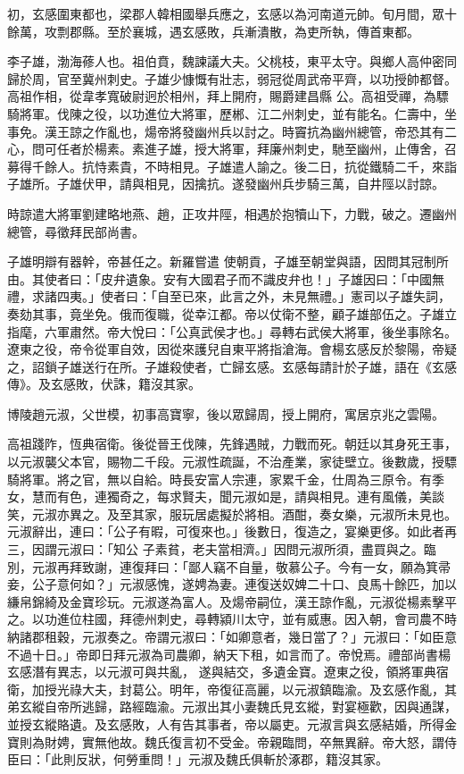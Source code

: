 \begin{pinyinscope}
 初，玄感圍東都也，梁郡人韓相國舉兵應之，玄感以為河南道元帥。旬月間，眾十餘萬，攻剽郡縣。至於襄城，遇玄感敗，兵漸潰散，為吏所執，傳首東都。



 李子雄，渤海蓚人也。祖伯賁，魏諫議大夫。父桃枝，東平太守。與鄉人高仲密同歸於周，官至冀州刺史。子雄少慷慨有壯志，弱冠從周武帝平齊，以功授帥都督。高祖作相，從韋孝寬破尉迥於相州，拜上開府，賜爵建昌縣
 公。高祖受禪，為驃騎將軍。伐陳之役，以功進位大將軍，歷郴、江二州刺史，並有能名。仁壽中，坐事免。漢王諒之作亂也，煬帝將發幽州兵以討之。時竇抗為幽州總管，帝恐其有二心，問可任者於楊素。素進子雄，授大將軍，拜廉州刺史，馳至幽州，止傳舍，召募得千餘人。抗恃素貴，不時相見。子雄遣人諭之。後二日，抗從鐵騎二千，來詣子雄所。子雄伏甲，請與相見，因擒抗。遂發幽州兵步騎三萬，自井陘以討諒。



 時諒遣大將軍劉建略地燕、趙，正攻井陘，相遇於抱犢山下，力戰，破之。遷幽州總管，尋徵拜民部尚書。



 子雄明辯有器幹，帝甚任之。新羅嘗遣
 使朝貢，子雄至朝堂與語，因問其冠制所由。其使者曰：「皮弁遺象。安有大國君子而不識皮弁也！」子雄因曰：「中國無禮，求諸四夷。」使者曰：「自至已來，此言之外，未見無禮。」憲司以子雄失詞，奏劾其事，竟坐免。俄而復職，從幸江都。帝以仗衛不整，顧子雄部伍之。子雄立指麾，六軍肅然。帝大悅曰：「公真武侯才也。」尋轉右武侯大將軍，後坐事除名。遼東之役，帝令從軍自效，因從來護兒自東平將指滄海。會楊玄感反於黎陽，帝疑之，詔鎖子雄送行在所。子雄殺使者，亡歸玄感。玄感每請計於子雄，語在《玄感傳》。及玄感敗，伏誅，籍沒其家。



 博陵趙元淑，父世模，初事高寶寧，後以眾歸周，授上開府，寓居京兆之雲陽。



 高祖踐阼，恆典宿衛。後從晉王伐陳，先鋒遇賊，力戰而死。朝廷以其身死王事，以元淑襲父本官，賜物二千段。元淑性疏誕，不治產業，家徒壁立。後數歲，授驃騎將軍。將之官，無以自給。時長安富人宗連，家累千金，仕周為三原令。有季女，慧而有色，連獨奇之，每求賢夫，聞元淑如是，請與相見。連有風儀，美談笑，元淑亦異之。及至其家，服玩居處擬於將相。酒酣，奏女樂，元淑所未見也。元淑辭出，連曰：「公子有暇，可復來也。」後數日，復造之，宴樂更侈。如此者再三，因謂元淑曰：「知公
 子素貧，老夫當相濟。」因問元淑所須，盡買與之。臨別，元淑再拜致謝，連復拜曰：「鄙人竊不自量，敬慕公子。今有一女，願為箕帚妾，公子意何如？」元淑感愧，遂娉為妻。連復送奴婢二十口、良馬十餘匹，加以縑帛錦綺及金寶珍玩。元淑遂為富人。及煬帝嗣位，漢王諒作亂，元淑從楊素擊平之。以功進位柱國，拜德州刺史，尋轉潁川太守，並有威惠。因入朝，會司農不時納諸郡租穀，元淑奏之。帝謂元淑曰：「如卿意者，幾日當了？」元淑曰：「如臣意不過十日。」帝即日拜元淑為司農卿，納天下租，如言而了。帝悅焉。禮部尚書楊玄感潛有異志，以元淑可與共亂，
 遂與結交，多遺金寶。遼東之役，領將軍典宿衛，加授光祿大夫，封葛公。明年，帝復征高麗，以元淑鎮臨渝。及玄感作亂，其弟玄縱自帝所逃歸，路經臨渝。元淑出其小妻魏氏見玄縱，對宴極歡，因與通謀，並授玄縱賂遺。及玄感敗，人有告其事者，帝以屬吏。元淑言與玄感結婚，所得金寶則為財娉，實無他故。魏氏復言初不受金。帝親臨問，卒無異辭。帝大怒，謂侍臣曰：「此則反狀，何勞重問！」元淑及魏氏俱斬於涿郡，籍沒其家。




\end{pinyinscope}
